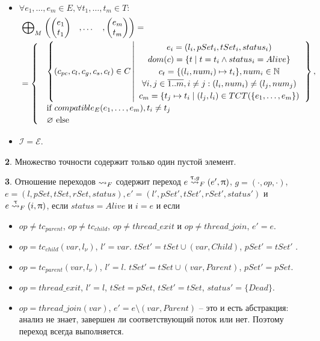 \begin{itemize}
\item $\forall e_1, \dots, e_m \in E, \forall t_1, \dots, t_m \in T:$
\begin{equation}
\label{epp_thread_M}
\begin{aligned}
& \mathrel{\bigoplus}_{M}
\begin{pmatrix}
\begin{pmatrix}
e_1 \\
t_1 
\end{pmatrix}& ,
\dots& ,
\begin{pmatrix}
e_m \\
t_m 
\end{pmatrix}
\end{pmatrix} = \\
& = \begin{cases}
& \left\lbrace (c_{pc},c_l,c_g,c_s, c_t) \in C 
\left| 
\begin{array}{c}
e_i = (l_i, pSet_i, tSet_i, status_i) \\
dom(c) = \{t \mid t = t_i \land status_i = Alive\}\\
c_t = \{(l_i, num_i) \mapsto t_i\}, num_i \in \mathbb{N} \\
\forall i, j \in \overline{1..m}, i \neq j: (l_i, num_i) \neq (l_j, num_j)\\
c_m = \{ t_j \mapsto t_i \mid (l_j, l_i) \in TCT(\{e_1, \dots, e_m\}) \\
\end{array}
\right.
\right\rbrace, \\
& \mbox{if } compatible_{E}(e_1, \dots, e_m), t_i \neq t_j \\
& \varnothing \mbox{ else}
\end{cases}
\end{aligned}
\end{equation}

\item $\mathcal{I}=\mathcal{E}$. 
\end{itemize}

{\textbf 2.} Множество точности содержит только один пустой элемент.

{\textbf 3.} Отношение переходов $\leadsto_F$ содержит переход $e \stackrel{\uptau, g}{\leadsto}_F (e', \uppi)$, $g=(\cdot,op,\cdot)$, $e = (l, pSet, tSet, rSet, status), e' = (l', pSet', tSet', rSet', status')$ и $e \stackrel{\uptau}{\leadsto}_F (i, \uppi)$, если $status = Alive$ и $i = e$ и если
\begin{itemize}
\item $op \neq tc_{parent}$, $op \neq tc_{child}$, $op \neq thread\_exit$ и $op \neq thread\_join$, $e' = e$.
\item $op=tc_{child}(var, l_\nu)$, $l' = var$. $tSet' = tSet \cup (var, Child)$, $pSet' = tSet'$ .
\item $op=tc_{parent}(var, l_\nu)$, $l' = l$. $tSet' = tSet \cup (var, Parent)$, $pSet' = pSet$.
\item $op=thread\_exit$, $l' = l$, $tSet = pSet$, $tSet' = tSet$, $status' = \{Dead\}$.
\item $op=thread\_join(var)$, $e' = e \setminus (var, Parent)$ -- это и есть абстракция: анализ не знает, завершен ли соответствующий поток или нет. Поэтому переход всегда выполняется.
\end{itemize}

